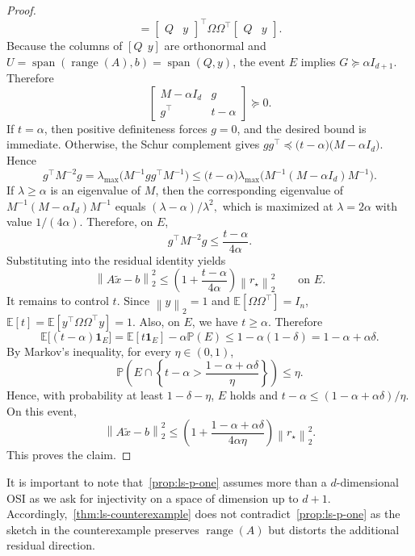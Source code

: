 \documentclass[onefignum,onetabnum]{siamart251216}
\newcommand{\E}{\mathbb{E}}
\newcommand{\Prob}{\mathbb{P}}
\newcommand{\norm}[1]{\left\lVert #1 \right\rVert}
\newcommand{\range}{\operatorname{range}}
\begin{document}
\begin{proof}
\[=
\begin{bmatrix}Q & y\end{bmatrix}^\top
\Omega\Omega^\top
\begin{bmatrix}Q & y\end{bmatrix}.
\]
Because the columns of $[Q\ \ y]$ are orthonormal and $U=\operatorname{span}(\range(A),b)=\operatorname{span}(Q,y)$,
the event $E$ implies
$
G \succeq \alpha I_{d+1}.
$
Therefore
\[
\begin{bmatrix}
M- \alpha I_d & g\\
g^\top & t- \alpha 
\end{bmatrix}
\succeq 0.
\]
If $t= \alpha $, then positive definiteness forces $g=0$, and the desired bound is immediate. Otherwise,
the Schur complement gives
$
gg^\top \preceq \bigl(t- \alpha \bigr)\bigl(M- \alpha I_d\bigr).
$
Hence
\[
g^\top M^{-2}g
=
\lambda_{\max}\!\bigl(M^{-1}gg^\top M^{-1}\bigr)
\le
\bigl(t- \alpha \bigr)
\lambda_{\max}\!\bigl(M^{-1}(M- \alpha I_d)M^{-1}\bigr).
\]
If $\lambda\ge  \alpha $ is an eigenvalue of $M$, then the corresponding eigenvalue of
$M^{-1}(M- \alpha I_d)M^{-1}$ equals
$
(\lambda- \alpha )/\lambda^2,
$
which is maximized at $\lambda=2 \alpha $ with value $1/(4 \alpha )$. Therefore,
on $E$,
\[
g^\top M^{-2}g \le \frac{t- \alpha }{4 \alpha }.
\]
Substituting into the residual identity yields
\[
\norm{A\widetilde x-b}_2^2
\le
\left(1+\frac{t- \alpha }{4 \alpha }\right)\norm{r_\star}_2^2
\qquad \text{on } E.
\]
It remains to control $t$. Since $\norm{y}_2=1$ and $\E[\Omega\Omega^\top]=I_n$,
$
\E[t] = \E[y^\top\Omega\Omega^\top y] = 1.
$
Also, on $E$, we have $t\ge  \alpha $. Therefore
\[
\E\bigl[(t- \alpha )\mathbf 1_E\bigr]
=
\E[t\mathbf 1_E] -  \alpha \Prob(E)
\le
1- \alpha (1-\delta)
=
1- \alpha + \alpha \delta.
\]
By Markov's inequality, for every $\eta\in(0,1)$,
\[
\Prob\!\left(
E \cap
\left\{
t- \alpha  > \frac{1- \alpha + \alpha \delta}{\eta}
\right\}
\right)
\le \eta.
\]
Hence, with probability at least $1-\delta-\eta$,  $E$ holds and
$
t- \alpha  \le (1- \alpha + \alpha \delta)/\eta.
$
On this event,
\[
\norm{A\widetilde x-b}_2^2
\le
\left(1+\frac{1- \alpha + \alpha \delta}{4 \alpha \eta}\right)\norm{r_\star}_2^2.
\]
This proves the claim. 
\end{proof}

It is important to note that~\cref{prop:ls-p-one} assumes more than a $d$-dimensional OSI as we ask for injectivity on a space of dimension up to $d+1$.  Accordingly,~\cref{thm:ls-counterexample} does not contradict~\cref{prop:ls-p-one} as the sketch in the counterexample preserves $\range(A)$ but distorts the additional residual direction. 
\end{document}
